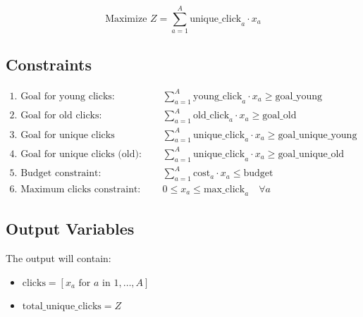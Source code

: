 \documentclass{article}
\begin{document}
\[
\text{Maximize } Z = \sum_{a=1}^{A} \text{unique\_click}_a \cdot x_a
\]

\subsection*{Constraints}
\begin{align*}
    \text{1. Goal for young clicks:} & \quad \sum_{a=1}^{A} \text{young\_click}_a \cdot x_a \geq \text{goal\_young} \\
    \text{2. Goal for old clicks:} & \quad \sum_{a=1}^{A} \text{old\_click}_a \cdot x_a \geq \text{goal\_old} \\
    \text{3. Goal for unique clicks (young):} & \quad \sum_{a=1}^{A} \text{unique\_click}_a \cdot x_a \geq \text{goal\_unique\_young} \\
    \text{4. Goal for unique clicks (old):} & \quad \sum_{a=1}^{A} \text{unique\_click}_a \cdot x_a \geq \text{goal\_unique\_old} \\
    \text{5. Budget constraint:} & \quad \sum_{a=1}^{A} \text{cost}_a \cdot x_a \leq \text{budget} \\
    \text{6. Maximum clicks constraint:} & \quad 0 \leq x_a \leq \text{max\_click}_a \quad \forall a
\end{align*}

\subsection*{Output Variables}
The output will contain:
\begin{itemize}
    \item \( \text{clicks} = [x_a \text{ for } a \text{ in } 1, \ldots, A] \)
    \item \( \text{total\_unique\_clicks} = Z \)
\end{itemize}
\end{document}
